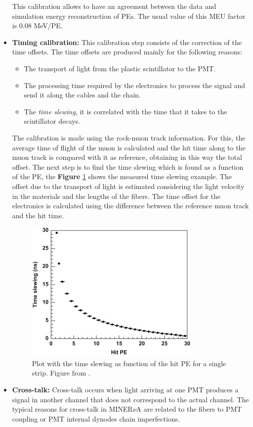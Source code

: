 \begin{itemize}
    This calibration allows to have an agreement between the data and simulation energy reconstruction of PEs. The usual value of this MEU factor is 0.08 MeV/PE.
    \item \textbf{Timing calibration:} This calibration step consists of the correction of the time offsets. The time offsets are produced mainly for the following reasons:
    \begin{itemize}
        \item The transport of light from the plastic scintillator to the PMT.
        \item The processing time required by the electronics to process the signal and send it along the cables and the chain.  
        \item The \textit{time slewing}, it is correlated with the time that it takes to the scintillator decays.
    \end{itemize}

    The calibration is made using the rock-muon track information. For this, the average time of flight of the muon is calculated and the hit time along to the muon track is compared with it as reference, obtaining in this way the total offset. The next step is to find the time slewing which is found as a function of the PE, the \textbf{Figure} \ref{fig:MnvExp:MnvDetector:Calibration:InSitu:SlewingFunc} shows the measured time slewing example. The offset due to the transport of light is estimated considering the light velocity in the materials and the lengths of the fibers. The time offset for the electronics is calculated using the difference between the reference muon track and the hit time.  
    \begin{figure}[!htb]
        \centering
        \includegraphics{Figures/Chapter2/SlewingFunction.jpg}
        \caption{Plot with the time slewing as function of the hit PE for a single strip. Figure from \cite{MINERvA}.}
        \label{fig:MnvExp:MnvDetector:Calibration:InSitu:SlewingFunc}
    \end{figure}
    \item \textbf{Cross-talk:} Cross-talk occurs when light arriving at one PMT produces a signal in another channel that does not correspond to the actual channel. The typical reasons for cross-talk in MINER$\nu$A are related to the fibers to PMT coupling or PMT internal dynodes chain imperfections.


\end{itemize}
